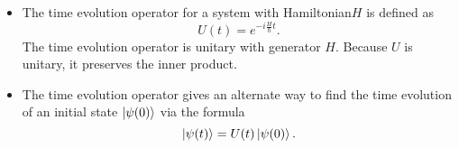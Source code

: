 \documentclass[11pt, a4paper]{article}
\newcommand{\Ham}{Hamiltonian\xspace}
\begin{document}
\begin{itemize}
    \item The time evolution operator for a system with \Ham $ H $ is defined as
    \begin{equation*}
        U(t) = e^{-i \frac{H}{\hbar}t}.
    \end{equation*}
    The time evolution operator is unitary with generator $ H $. Because $ U $ is unitary, it preserves the inner product.

    \item The time evolution operator gives an alternate way to find the time evolution of an initial state $ \ket{\psi(0)} $ via the formula
    \begin{equation*}
        \ket{\psi(t)} = U(t) \ket{\psi(0)}.
    \end{equation*}
    
\end{itemize}
\end{document}
